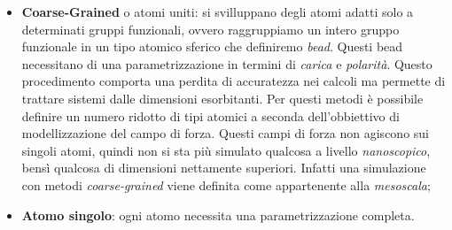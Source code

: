\documentclass[oneside]{amsbook}
\numberwithin{section}{chapter}
\numberwithin{equation}{section}
\numberwithin{figure}{section}
\begin{document}
\begin{itemize}
\item \textbf{Coarse-Grained} o atomi uniti: si svilluppano degli atomi adatti solo a determinati gruppi funzionali, ovvero raggruppiamo un intero gruppo funzionale in un tipo atomico sferico che definiremo \emph{bead}. Questi bead necessitano di una parametrizzazione in termini di \emph{carica} e \emph{polarità}. Questo procedimento comporta una perdita di accuratezza nei calcoli ma permette di trattare sistemi dalle dimensioni esorbitanti. Per questi metodi è possibile definire un numero ridotto di tipi atomici a seconda dell'obbiettivo di modellizzazione del campo di forza. Questi campi di forza non agiscono sui singoli atomi, quindi non si sta più simulato qualcosa a livello \emph{nanoscopico}, bensì qualcosa di dimensioni nettamente superiori. Infatti una simulazione con metodi \emph{coarse-grained} viene definita come appartenente alla \emph{mesoscala};
\item \textbf{Atomo singolo}: ogni atomo necessita una parametrizzazione completa.
\end{itemize}
\end{document}
